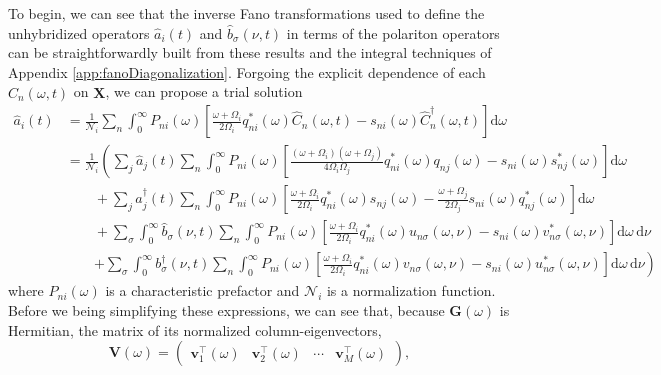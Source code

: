 To begin, we can see that the inverse Fano transformations used to define the unhybridized operators $\hat{a}_i(t)$ and $\hat{b}_\sigma(\nu,t)$ in terms of the polariton operators can be straightforwardly built from these results and the integral techniques of Appendix \ref{app:fanoDiagonalization}. Forgoing the explicit dependence of each $\hat{C}_n(\omega,t)$ on $\mathbf{X}$, we can propose a trial solution
\begin{equation}
\begin{split}
\hat{a}_i(t) &= \frac{1}{\mathcal{N}_i}\sum_n\int_0^\infty P_{ni}(\omega)\left[\frac{\omega + \Omega_i}{2\Omega_i}q_{ni}^*(\omega)\hat{C}_n(\omega,t) - s_{ni}(\omega)\hat{C}_{n}^\dagger(\omega,t)\right]\mathrm{d}\omega\\
&= \frac{1}{\mathcal{N}_i}\left(\sum_j\hat{a}_j(t)\sum_n\int_0^\infty P_{ni}(\omega)\left[\frac{(\omega + \Omega_i)(\omega + \Omega_j)}{4\Omega_i\Omega_j}q_{ni}^*(\omega)q_{nj}(\omega) - s_{ni}(\omega)s_{nj}^*(\omega)\right]\mathrm{d}\omega\right.\\
&\qquad + \sum_j\hat{a}_j^\dagger(t)\sum_n\int_0^\infty P_{ni}(\omega)\left[\frac{\omega + \Omega_i}{2\Omega_i}q_{ni}^*(\omega)s_{nj}(\omega) - \frac{\omega + \Omega_j}{2\Omega_j}s_{ni}(\omega)q_{nj}^*(\omega)\right]\mathrm{d}\omega\\
&\qquad + \sum_\sigma\int_0^\infty\hat{b}_\sigma(\nu,t)\sum_n\int_0^\infty P_{ni}(\omega)\left[\frac{\omega + \Omega_i}{2\Omega_i}q_{ni}^*(\omega)u_{n\sigma}(\omega,\nu) - s_{ni}(\omega)v_{n\sigma}^*(\omega,\nu)\right]\mathrm{d}\omega\,\mathrm{d}\nu\\
&\qquad\left. + \sum_\sigma\int_0^\infty b_\sigma^\dagger(\nu,t)\sum_n\int_0^\infty P_{ni}(\omega)\left[\frac{\omega + \Omega_i}{2\Omega_i}q_{ni}^*(\omega)v_{n\sigma}(\omega,\nu) - s_{ni}(\omega)u_{n\sigma}^*(\omega,\nu)\right]\mathrm{d}\omega\,\mathrm{d}\nu\right)
\end{split}
\end{equation}
where $P_{ni}(\omega)$ is a characteristic prefactor and $\mathcal{N}_i$ is a normalization function. Before we being simplifying these expressions, we can see that, because $\mathbf{G}(\omega)$ is Hermitian, the matrix of its normalized column-eigenvectors,
\begin{equation}
\mathbf{V}(\omega) =
\begin{pmatrix}
\mathbf{v}_1^\top(\omega) & \mathbf{v}_2^\top(\omega) & \cdots & \mathbf{v}_M^\top(\omega) 
\end{pmatrix},
\end{equation}
